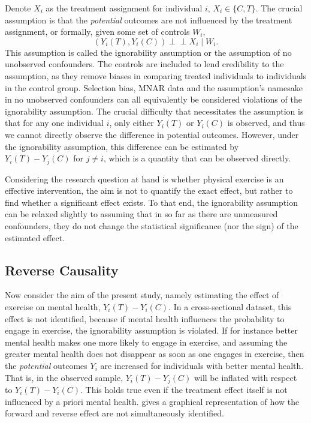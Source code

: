 Denote $X_i$ as the treatment assignment for individual $i$, $X_i \in \{C, T\}$. The crucial assumption is that the
\textit{potential} outcomes are not influenced by the treatment assignment, or formally, given some set of controls
$W_i$,
\begin{equation}
    \label{eq:methods:ignorability_assumption}
    (Y_i(T), Y_i(C)) \perp\!\!\!\perp X_i \mid W_i.
\end{equation}
This assumption is called the ignorability assumption or the assumption of no unobserved confounders.
The controls are included to lend credibility to the assumption, as they remove biases in comparing treated individuals
to individuals in the control group.
Selection bias, MNAR data and the assumption's namesake in no unobserved confounders can all equivalently be considered
violations of the ignorability assumption.
The crucial difficulty that necessitates the assumption is that for any one individual $i$,
only either $Y_i(T)$ or $Y_i(C)$ is observed, and thus we cannot directly observe the difference in potential outcomes.
However, under the ignorability assumption, this difference can be estimated by $Y_i(T) - Y_j(C)$ for $j \neq i$,
which is a quantity that can be observed directly.

Considering the research question at hand is whether physical exercise is an effective intervention, the aim is not to
quantify the exact effect, but rather to find whether a significant effect exists. To that end, the ignorability assumption
can be relaxed slightly to assuming that in so far as there are unmeasured confounders, they do not change the statistical
significance (nor the sign) of the estimated effect.

\subsection{Reverse Causality}
\label{sec:methods:reverse_causality}
Now consider the aim of the present study, namely estimating the effect of exercise on mental health, $Y_i(T) - Y_i(C)$.
In a cross-sectional dataset, this effect is not identified,
because if mental health influences the probability to engage in exercise, the ignorability assumption is violated.
If for instance better mental health makes one more likely to engage in exercise, and assuming the greater mental health
does not disappear as soon as one engages in exercise, then the \textit{potential} outcomes $Y_i$ are increased
for individuals with better mental health. That is, in the observed sample, $Y_i(T) - Y_j(C)$ will be inflated with respect to
$Y_i(T) - Y_i(C)$.
This holds true even if the treatment effect itself is not influenced by a priori mental health.
 gives a graphical representation of how the forward and reverse effect
are not simultaneously identified.

